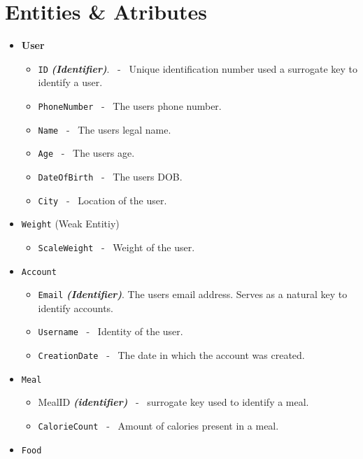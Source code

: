 \documentclass[letterpaper, 11pt]{article}
\newcommand{\1}{\mathds{1}}	%
\theoremstyle{definition}
\begin{document}
\section{Entities \& Atributes}
\begin{itemize}
    \item \textbf{User}
        \begin{itemize}[label=$\circ$]
            \item \texttt{ID} \textit{\textbf{(Identifier)}}. \ - \ Unique identification number used a surrogate key to identify a user.
            \item \texttt{PhoneNumber}  \ - \ The users phone number.
            \item \texttt{Name} \ - \ The users legal name.
            \item \texttt{Age} \ - \ The users age.
            \item \texttt{DateOfBirth} \ - \ The users DOB.
            \item \texttt{City} \ - \ Location of the user.
        \end{itemize}
    \item \texttt{Weight} (Weak Entitiy)
        \begin{itemize}[label=$\circ$]
            \item \texttt{ScaleWeight} \ - \ Weight of the user.
        \end{itemize}
    \item \texttt{Account}
        \begin{itemize}[label=$\circ$]
            \item \texttt{Email} \textit{\textbf{(Identifier)}}. The users email address. Serves as a natural key to identify accounts.
            \item \texttt{Username} \ - \ Identity of the user. 
            \item \texttt{CreationDate} \ - \  The date in which the account was created.
        \end{itemize}
    \item \texttt{Meal}
        \begin{itemize}[label=$\circ$]
            \item MealID \textit{\textbf{(identifier)}} \ - \ surrogate key used to identify a meal.
            \item \texttt{CalorieCount} \ - \ Amount of calories present in a meal.
        \end{itemize}
    \item\texttt{Food}

\end{itemize}
\end{document}
